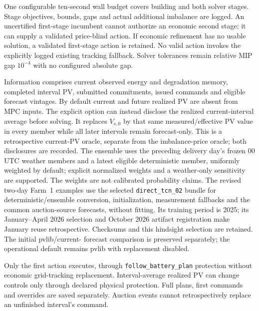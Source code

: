 \documentclass[11pt,a4paper]{article}
\begin{document}
One configurable ten-second wall budget covers building and both solver stages.
Stage objectives, bounds, gaps and actual additional imbalance are logged.
An uncertified first-stage incumbent cannot authorize an economic second stage;
it can supply a validated price-blind action. If economic refinement has no
usable solution, a validated first-stage action is retained. No valid action
invokes the explicitly logged existing tracking fallback. Solver tolerances
remain relative MIP gap $10^{-4}$ with no configured absolute gap.

Information comprises current observed energy and degradation memory, completed
interval PV, submitted commitments, issued commands and eligible forecast
vintages. By default current and future realized PV are absent from MPC inputs.
The explicit  option can instead
disclose the realized current-interval average before solving. It replaces
$V_{s,0}$ by that same measured/effective PV value in every member while all
later intervals remain forecast-only. This is a retrospective current-PV oracle,
separate from the imbalance-price oracle; both disclosures are recorded.
The ensemble
uses the preceding delivery day's frozen 00 UTC weather members and a latest
eligible deterministic member, uniformly weighted by default; explicit normalized
weights and a weather-only sensitivity are supported. The weights are not
calibrated probability claims. The revised two-day Farm~1 examples use the
selected \texttt{direct\_tcn\_02} bundle for deterministic/ensemble conversion,
initialization, measurement fallbacks and the common auction-source forecasts,
without fitting. Its training period is 2025; its January--April 2026 selection
and October 2026 artifact registration make January reuse retrospective.
Checksums and this hindsight selection are retained. The initial pvlib/current-
forecast comparison is preserved separately; the operational default remains
pvlib with replacement disabled.

Only the first action executes, through \texttt{follow\_battery\_plan} protection
without economic grid-tracking replacement. Interval-average realized PV can
change controls only through declared physical protection. Full plans, first
commands and overrides are saved separately. Auction events cannot retrospectively
replace an unfinished interval's command.
\end{document}

